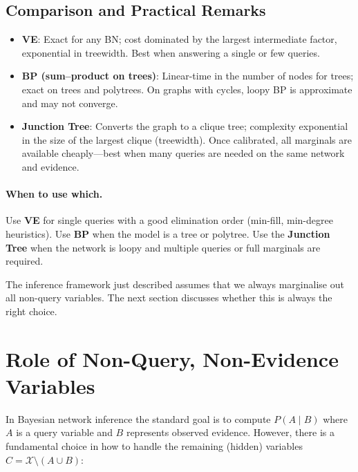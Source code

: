 \subsection{Comparison and Practical Remarks}

\begin{itemize}
\item \textbf{VE}: Exact for any BN; cost dominated by the largest
      intermediate factor, exponential in treewidth. Best when answering
      a single or few queries.
\item \textbf{BP (sum--product on trees)}: Linear-time in the number of
      nodes for trees; exact on trees and polytrees. On graphs with cycles,
      loopy BP is approximate and may not converge.
\item \textbf{Junction Tree}: Converts the graph to a clique tree;
      complexity exponential in the size of the largest clique (treewidth).
      Once calibrated, all marginals are available cheaply---best when many
      queries are needed on the same network and evidence.
\end{itemize}

\paragraph{When to use which.}
Use \textbf{VE} for single queries with a good elimination order (min-fill,
min-degree heuristics). Use \textbf{BP} when the model is a tree or polytree.
Use the \textbf{Junction Tree} when the network is loopy and multiple queries
or full marginals are required.

\medskip
The inference framework just described assumes that we always marginalise out
all non-query variables. The next section discusses whether this is always
the right choice.
\section{Role of Non-Query, Non-Evidence Variables}\label{sec:paradigms}

In Bayesian network inference the standard goal is to compute $P(A\mid B)$
where $A$ is a query variable and $B$ represents observed evidence. However,
there is a fundamental choice in how to handle the remaining (hidden) variables
$C=\mathcal{X}\setminus(A\cup B)$:

